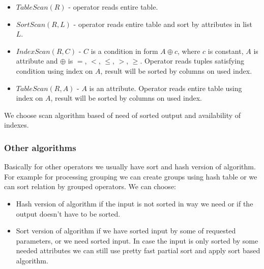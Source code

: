 \begin{itemize}
\item $TableScan(R)$ - operator reads entire table.

\item $SortScan(R,L)$ - operator reads entire table and sort by attributes in list~$L$.

\item $IndexScan(R,C)$ - $C$ is a condition in form $A\oplus c$, where $c$ is constant, $A$ is attribute and $\oplus$ is $=$, $<$, $\leq$, $>$, $\geq$. Operator reads tuples satisfying condition using index on $A$, result will be sorted by columns on used index.

\item $TableScan(R,A)$ - $A$ is an attribute. Operator reads entire table using index on $A$, result will be sorted by columns on used index.

\end{itemize}

We choose scan algorithm based of need of sorted output and availability of indexes.

\subsubsection{Other algorithms}

Basically for other operators we usually have sort and hash version of algorithm. For example for processing grouping we can create groups using hash table or we can sort relation by grouped operators. We can choose:

\begin{itemize}
\item Hash version of algorithm if the input is not sorted in way we need or if the output doesn't have to be sorted.

\item Sort version of algorithm if we have sorted input by some of requested parameters, or we need sorted input. In case the input is only sorted by some needed attributes we can still use pretty fast partial sort and apply sort based algorithm.

\end{itemize}